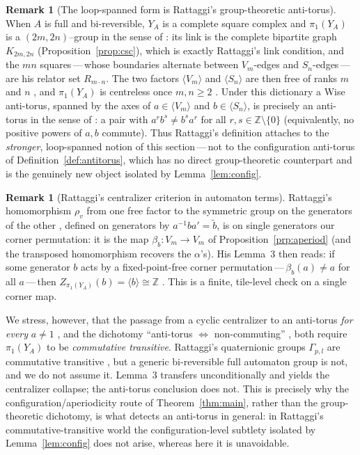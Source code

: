 \documentclass[11pt,reqno]{amsart}
\theoremstyle{plain}
\theoremstyle{definition}
\newtheorem{remark}[theorem]{Remark}
\newcommand{\ZZ}{\mathbb{Z}}
\newcommand{\Vm}{V_m}
\newcommand{\Sn}{S_n}
\begin{document}
\begin{remark}[The loop-spanned form is Rattaggi's group-theoretic anti-torus]
\label{rem:rattaggi}
When $A$ is full and bi-reversible, $Y_A$ is a complete square complex and
$\pi_1(Y_A)$ is a $(2m,2n)$--group in the sense of \cite[\S1]{Rat}: its link is the
complete bipartite graph $K_{2m,2n}$ (Proposition~\ref{prop:csc}), which is exactly
Rattaggi's link condition, and the $mn$ squares\,---\,whose boundaries alternate
between $\Vm$-edges and $\Sn$-edges\,---\,are his relator set $R_{m\cdot n}$. The two
factors $\langle\Vm\rangle$ and $\langle\Sn\rangle$ are then free of ranks $m$ and
$n$ \cite[Corollary~2(1)]{Rat}, and $\pi_1(Y_A)$ is centreless once $m,n\ge2$
\cite[Corollary~2(2)]{Rat}. Under this dictionary a Wise anti-torus, spanned by the
axes of $a\in\langle\Vm\rangle$ and $b\in\langle\Sn\rangle$, is precisely an
anti-torus in the sense of \cite[Definition~4]{Rat}: a pair with
$a^{r}b^{s}\neq b^{s}a^{r}$ for all $r,s\in\ZZ\setminus\{0\}$ (equivalently, no
positive powers of $a,b$ commute). Thus Rattaggi's definition attaches to the
\emph{stronger}, loop-spanned notion of this section\,---\,not to the configuration
anti-torus of Definition~\ref{def:antitorus}, which has no direct group-theoretic
counterpart and is the genuinely new object isolated by Lemma~\ref{lem:config}.
\end{remark}

\begin{remark}[Rattaggi's centralizer criterion in automaton terms]\label{rem:rho}
Rattaggi's homomorphism $\rho_v$ from one free factor to the symmetric group on the
generators of the other \cite[\S1]{Rat}, defined on generators by
$a^{-1}ba'=\tilde b$, is on single generators our corner permutation: it is the map
$\beta_{b}\colon\Vm\to\Vm$ of Proposition~\ref{prp:aperiod} (and the transposed
homomorphism recovers the $\alpha$'s). His Lemma~3 then reads: if some generator
$b$ acts by a fixed-point-free corner permutation\,---\,$\beta_{b}(a)\neq a$ for all
$a$\,---\,then $Z_{\pi_1(Y_A)}(b)=\langle b\rangle\cong\ZZ$
\cite[Lemma~3]{Rat}. This is a finite, tile-level check on a single corner map.

We stress, however, that the passage from a cyclic centralizer to an anti-torus
\emph{for every} $a\neq1$ \cite[Corollary~8]{Rat}, and the dichotomy ``anti-torus
$\iff$ non-commuting'' \cite[Proposition~5]{Rat}, both require $\pi_1(Y_A)$ to be
\emph{commutative transitive}. Rattaggi's quaternionic groups $\Gamma_{p,l}$ are
commutative transitive \cite[Proposition~14]{Rat}, but a generic bi-reversible full
automaton group is not, and we do not assume it. Lemma~3 transfers unconditionally
and yields the centralizer collapse; the anti-torus conclusion does not. This is
precisely why the configuration/aperiodicity route of Theorem~\ref{thm:main}, rather
than the group-theoretic dichotomy, is what detects an anti-torus in general: in
Rattaggi's commutative-transitive world the configuration-level subtlety isolated by
Lemma~\ref{lem:config} does not arise, whereas here it is unavoidable.
\end{remark}
\end{document}
